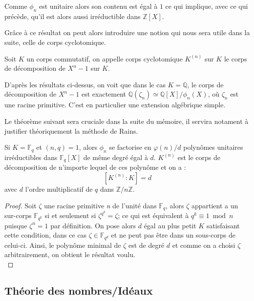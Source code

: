 \documentclass[a4paper]{article} %
\numberwithin{equation}{section}
\newcommand\nroot[1]{\textit{#1}\up{\textit{ième}}}
\newcommand\zmodn[1]{\mathbb{Z}/#1\mathbb{Z}}
\newcommand\GF[1]{\mathbb{F}_{#1}}
\begin{document}
\begin{rem}
Comme $\phi_n$ est unitaire alors son contenu est égal à $1$ ce qui implique, 
avec ce qui précède, qu'il est alors aussi irréductible dans $\mathbb{Z}[X]$.
\end{rem}
\vspace{0.3cm}
Grâce à ce résultat on peut alors introduire une notion qui nous sera utile dans
la suite, celle de corps cyclotomique.

\begin{defn}
Soit $K$ un corps commutatif, on appelle corps cyclotomique $K^{(n)}$ sur $K$ le
corps de décomposition de $X^n - 1$ sur $K$.
\end{defn}

\begin{rem}
D'après les résultats ci-dessus, on voit que dans le cas $K = \mathbb{Q}$, le 
corps de décomposition de $X^n - 1$ est exactement $\mathbb{Q}(\zeta_n) \simeq 
\mathbb{Q}[X]/\phi_n(X)$, où $\zeta_n$ est une racine primitive. C'est en 
particulier une extension algébrique simple.
\end{rem}

Le théorème suivant sera cruciale dans la suite du mémoire, il servira notament 
à justifier théoriquement la méthode de Rains.

\begin{thm}
\label{polycycldecomp}
Si $K = \GF{q}$ et $(n,q) = 1$, alors $\phi_n$ se factorise en $\varphi(n)/d$ 
polynômes unitaires irréductibles dans $\GF{q}[X]$ de même degré égal à $d$. 
$K^{(n)}$ est le corps de décomposition de n'importe lequel de ces polynôme et 
on a :
\[[K^{(n)}:K] = d\]
avec $d$ l'ordre multiplicatif de $q$ dans $\zmodn{n}$.
\end{thm}
\begin{proof}
Soit $\zeta$ une racine primitive \nroot{n} de l'unité dans $\GF{q}$, alors 
$\zeta$ appartient a un sur-corps $\GF{q^k}$ si et seulement si $\zeta^{q^k} = 
\zeta$; ce qui est équivalent à $q^k \equiv 1 \bmod n$ puisque $\zeta^n = 1$ par
définition. On pose alors $d$ égal au plus petit $K$ satisfaisant cette 
condition, dans ce cas $\zeta\in\GF{q^d}$ et ne peut pas être dans un sous-corps
de celui-ci. Ainsi, le polynôme minimal de $\zeta$ est de degré $d$ et comme on 
a choisi $\zeta$ arbitrairement, on obtient le résultat voulu.\\
\end{proof}

\subsection{Théorie des nombres/Idéaux}
\end{document}
